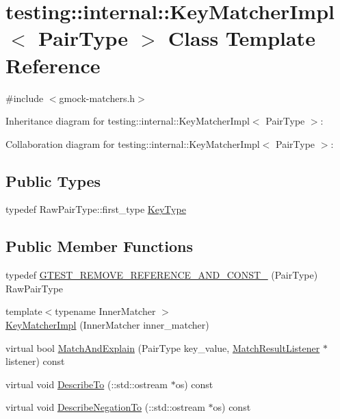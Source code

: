\hypertarget{classtesting_1_1internal_1_1_key_matcher_impl}{}\section{testing\+:\+:internal\+:\+:Key\+Matcher\+Impl$<$ Pair\+Type $>$ Class Template Reference}
\label{classtesting_1_1internal_1_1_key_matcher_impl}


{\ttfamily \#include $<$gmock-\/matchers.\+h$>$}



Inheritance diagram for testing\+:\+:internal\+:\+:Key\+Matcher\+Impl$<$ Pair\+Type $>$\+:


Collaboration diagram for testing\+:\+:internal\+:\+:Key\+Matcher\+Impl$<$ Pair\+Type $>$\+:
\subsection*{Public Types}
\begin{DoxyCompactItemize}
\item 
typedef Raw\+Pair\+Type\+::first\+\_\+type \hyperlink{classtesting_1_1internal_1_1_key_matcher_impl_a9bd63b699518bd9868ba24766547667a}{Key\+Type}
\end{DoxyCompactItemize}
\subsection*{Public Member Functions}
\begin{DoxyCompactItemize}
\item 
typedef \hyperlink{classtesting_1_1internal_1_1_key_matcher_impl_a006551fc32e5aef0d319a304ddc5f383}{G\+T\+E\+S\+T\+\_\+\+R\+E\+M\+O\+V\+E\+\_\+\+R\+E\+F\+E\+R\+E\+N\+C\+E\+\_\+\+A\+N\+D\+\_\+\+C\+O\+N\+S\+T\+\_\+} (Pair\+Type) Raw\+Pair\+Type
\item 
{\footnotesize template$<$typename Inner\+Matcher $>$ }\\\hyperlink{classtesting_1_1internal_1_1_key_matcher_impl_a9ad2a218b0366cae9fb09e82347bd8e7}{Key\+Matcher\+Impl} (Inner\+Matcher inner\+\_\+matcher)
\item 
virtual bool \hyperlink{classtesting_1_1internal_1_1_key_matcher_impl_afdf81c23c20be5825fe7a01d5e10a5cb}{Match\+And\+Explain} (Pair\+Type key\+\_\+value, \hyperlink{classtesting_1_1_match_result_listener}{Match\+Result\+Listener} $\ast$listener) const 
\item 
virtual void \hyperlink{classtesting_1_1internal_1_1_key_matcher_impl_a47683b123c983c7fa9299f1da43b8033}{Describe\+To} (\+::std\+::ostream $\ast$os) const 
\item 
virtual void \hyperlink{classtesting_1_1internal_1_1_key_matcher_impl_a45429cc899ff43b268aad48aa3ed0b12}{Describe\+Negation\+To} (\+::std\+::ostream $\ast$os) const 
\end{DoxyCompactItemize}


